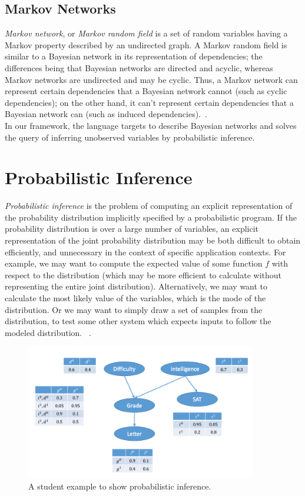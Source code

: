 \subsection{Markov Networks}
\textit{Markov network}, or \textit{Markov random field} is a set of random variables having a Markov property described by an undirected graph. A Markov random field is similar to a Bayesian network in its representation of dependencies; the differences being that Bayesian networks are directed and acyclic, whereas Markov networks are undirected and may be cyclic. Thus, a Markov network can represent certain dependencies that a Bayesian network cannot (such as cyclic dependencies); on the other hand, it can't represent certain dependencies that a Bayesian network can (such as induced dependencies).~\cite{markov}.\\

In our framework, the language targets to describe Bayesian networks and solves the query of inferring unobserved variables by probabilistic inference.

\section{Probabilistic Inference}
\label{sec:inferintro}
\textit{Probabilistic inference} is the problem of computing an explicit representation of the probability distribution implicitly specified by a probabilistic program. If the probability distribution is over a large number of variables, an explicit representation of the joint probability distribution may be both difficult to obtain efficiently, and unnecessary in the context of specific application contexts. For example, we may want to compute the expected value of some function $f$ with respect to the distribution (which may be more efficient to calculate without representing the entire joint distribution). Alternatively, we may want to calculate the most likely value of the variables, which is the mode of the distribution. Or we may want to simply draw a set of samples from the distribution, to test some other system which expects inputs to follow the modeled distribution. ~\cite{gordon2014}.

\begin{figure}
    \centering
    \includegraphics[width=0.9\textwidth]{figures/inference.png}
    \caption{A student example to show probabilistic inference.}
    \label{fig:infer_eg}
\end{figure}

